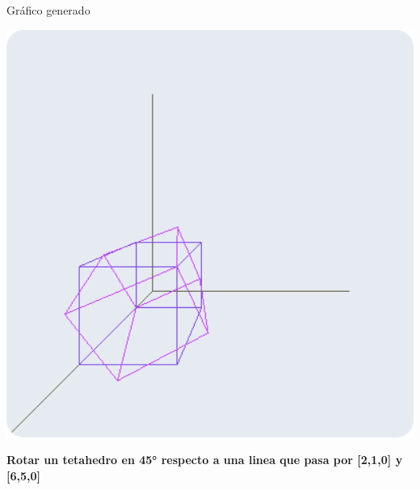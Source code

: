 \documentclass[a4paper]{article}
\begin{document}
Gráfico generado 
\begin{center}
\includegraphics[width=14cm]{./src/3.png}
\end{center}
\newpage
\Large{\textbf{Rotar un tetahedro en 45° respecto a una linea que pasa por [2,1,0] y [6,5,0]}}\\[-0.4cm]
\end{document}
